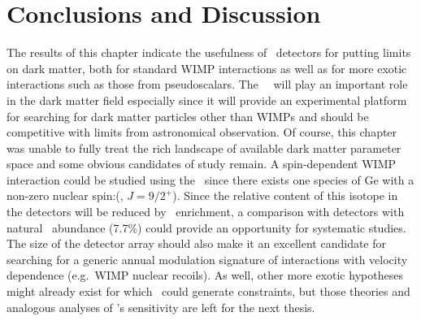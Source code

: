 	\section{Conclusions and Discussion}
	\label{sec:OtherLowEnergyConclusions}	
	
	The results of this chapter indicate the usefulness of \ppc~detectors for
putting limits on dark matter, both for standard WIMP interactions as well as
for more exotic interactions such as those from pseudoscalars.  The
\MJ~\minmod~will play an important role in the dark matter field especially
since it will provide an experimental platform for searching for dark matter
particles other than WIMPs and should be competitive with limits from
astronomical observation.  Of course, this chapter was unable to fully treat
the rich landscape of available dark matter parameter space and some obvious
candidates of study remain.  A spin-dependent WIMP interaction could be studied
using the \minmod~since there exists one species of Ge with a non-zero nuclear
spin:(\gerseventhree, $J=9/2^{+}$).  Since the relative content of this isotope
in the detectors will be reduced by \gersevensix~enrichment, a comparison with
detectors with natural \gerseventhree~abundance (7.7\%) could provide an
opportunity for systematic studies.  The size of the detector array should also
make it an excellent candidate for searching for a generic annual modulation
signature of interactions with velocity dependence (e.g.~WIMP nuclear recoils).
As well, other more exotic hypotheses might already exist for which \MJ~could
generate constraints, but those theories and analogous analyses of \MJ's
sensitivity are left for the next thesis.
	
